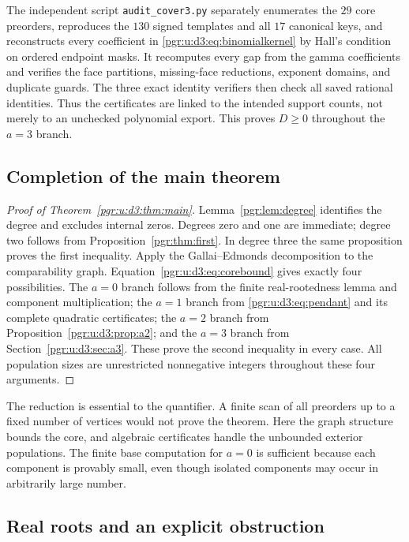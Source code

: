\documentclass[11pt]{article}
\numberwithin{equation}{section}
\theoremstyle{definition}\newtheorem{definition}[theorem]{Definition}\newtheorem{remark}[theorem]{Remark}
\begin{document}
The independent script \texttt{audit\_cover3.py} separately enumerates the $29$ core preorders, reproduces the $130$ signed templates and all $17$ canonical keys, and reconstructs every coefficient in \eqref{pgr:u:d3:eq:binomialkernel} by Hall's condition on ordered endpoint masks. It recomputes every gap from the gamma coefficients and verifies the face partitions, missing-face reductions, exponent domains, and duplicate guards. The three exact identity verifiers then check all saved rational identities. Thus the certificates are linked to the intended support counts, not merely to an unchecked polynomial export. This proves $D\ge0$ throughout the $a=3$ branch.

\subsection{Completion of the main theorem}

\begin{proof}[Proof of Theorem~\ref{pgr:u:d3:thm:main}]
Lemma~\ref{pgr:lem:degree} identifies the degree and excludes internal zeros. Degrees zero and one are immediate; degree two follows from Proposition~\ref{pgr:thm:first}. In degree three the same proposition proves the first inequality. Apply the Gallai--Edmonds decomposition to the comparability graph. Equation~\eqref{pgr:u:d3:eq:corebound} gives exactly four possibilities. The $a=0$ branch follows from the finite real-rootedness lemma and component multiplication; the $a=1$ branch from \eqref{pgr:u:d3:eq:pendant} and its complete quadratic certificates; the $a=2$ branch from Proposition~\ref{pgr:u:d3:prop:a2}; and the $a=3$ branch from Section~\ref{pgr:u:d3:sec:a3}. These prove the second inequality in every case. All population sizes are unrestricted nonnegative integers throughout these four arguments.
\end{proof}

The reduction is essential to the quantifier. A finite scan of all preorders up to a fixed number of vertices would not prove the theorem. Here the graph structure bounds the core, and algebraic certificates handle the unbounded exterior populations. The finite base computation for $a=0$ is sufficient because each component is provably small, even though isolated components may occur in arbitrarily large number.

\subsection{Real roots and an explicit obstruction}\label{pgr:u:d3:sec:realroots}
\end{document}
